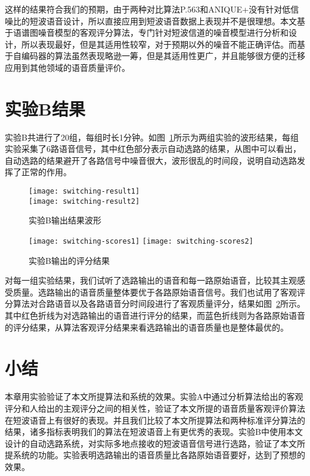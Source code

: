 这样的结果符合我们的预期，由于两种对比算法P.563和ANIQUE+没有针对低信噪比的短波语音设计，所以直接应用到短波语音数据上表现并不是很理想。本文基于语谱图噪音模型的客观评分算法，专门针对短波信道的噪音模型进行分析和设计，所以表现最好，但是其适用性较窄，对于预期以外的噪音不能正确评估。而基于自编码器的算法虽然表现略逊一筹，但是其适用性更广，并且能够很方便的迁移应用到其他领域的语音质量评价。

\section{实验B结果}

实验B共进行了20组，每组时长1分钟。如图~\ref{fig:switching-result}所示为两组实验的波形结果，每组实验采集了6路语音信号，其中红色部分表示自动选路的结果，从图中可以看出，自动选路的结果避开了各路信号中噪音很大，波形很乱的时间段，说明自动选路发挥了正常的作用。

\begin{figure}
\centering
{} {
    \texttt{[image: switching-result1]}
}
\vspace{0.8ex}
\\
 {
    \texttt{[image: switching-result2]}
}
\vspace{0.8ex}
\\
\caption{实验B输出结果波形\label{fig:switching-result}}
\end{figure}

\begin{figure}
\centering
\texttt{[image: switching-scores1]}
\texttt{[image: switching-scores2]}
\caption{实验B输出的评分结果\label{fig:switching-scores}}
\end{figure}

对每一组实验结果，我们试听了选路输出的语音和每一路原始语音，比较其主观感受质量。选路输出的语音质量整体要优于各路原始语音信号。我们也试用了客观评分算法对合路语音以及各路语音分时间段进行了客观质量评分，结果如图~\ref{fig:switching-scores}所示。其中红色折线为对选路输出的语音进行评分的结果，而蓝色折线则为各路原始语音的评分结果，从算法客观评分结果来看选路输出的语音质量也是整体最优的。

\section{小结}

本章用实验验证了本文所提算法和系统的效果。实验A中通过分析算法给出的客观评分和人给出的主观评分之间的相关性，验证了本文所提的语音质量客观评价算法在短波语音上有很好的表现。并且我们比较了本文所提算法和两种标准评分算法的结果，诸多指标表明我们的算法在短波语音上有更优秀的表现。实验B中使用本文设计的自动选路系统，对实际多地点接收的短波语音信号进行选路，验证了本文所提系统的功能。实验表明选路输出的语音质量比各路原始语音要好，达到了预想的效果。